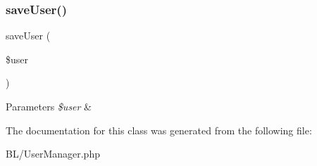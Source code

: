 \subsubsection{\texorpdfstring{saveUser()}{saveUser()}}
{\footnotesize\ttfamily save\+User (\begin{DoxyParamCaption}\item[{}]{\$user }\end{DoxyParamCaption})}


\begin{DoxyParams}{Parameters}
{\em \$user} & \\
\hline
\end{DoxyParams}


The documentation for this class was generated from the following file\+:\begin{DoxyCompactItemize}
\item 
B\+L/User\+Manager.\+php\end{DoxyCompactItemize}
